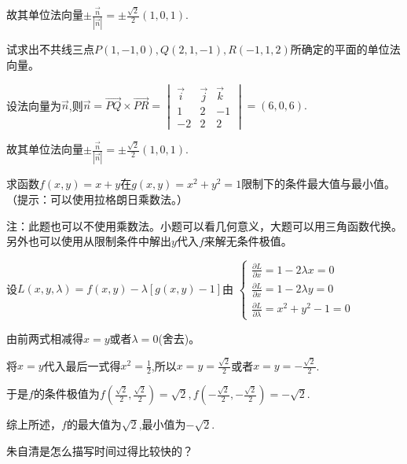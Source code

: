 \documentclass[addtable,twoside,12pt]{hnuexam}
\begin{document}
\begin{questions}
\begin{solution}
故其单位法向量$\pm\frac{\vec{n}}{|\vec{n}|}=\pm\frac{\sqrt{2}}{2}(1,0,1).$
\end{solution}

\question[9]
试求出不共线三点$P(1,-1,0),Q(2,1,-1),R(-1,1,2)$所确定的平面的单位法向量。
\begin{solution}
设法向量为$\vec{n}$,则$\vec{n}=\vec{PQ}\times\vec{PR}=
\begin{vmatrix}
	\vec{i} & \vec{j} & \vec{k} \\
	1       & 2       & -1      \\
	-2      & 2       & 2
\end{vmatrix}=(6,0,6).$
	
故其单位法向量$\pm\frac{\vec{n}}{|\vec{n}|}=\pm\frac{\sqrt{2}}{2}(1,0,1).$
\end{solution}
\clearpage

\question[10]
求函数$f(x,y)=x+y$在$g(x,y)=x^2+y^2=1$限制下的条件最大值与最小值。（提示：可以使用拉格朗日乘数法。）
\begin{solution}
注：此题也可以不使用乘数法。小题可以看几何意义，大题可以用三角函数代换。另外也可以使用从限制条件中解出$y$代入$f$来解无条件极值。

设$L(x,y,\lambda)=f(x,y)-\lambda [g(x,y)-1]$由
$\begin{cases}
	\frac{\partial L}{\partial x}=1-2\lambda x=0 \\
	\frac{\partial L}{\partial x}=1-2\lambda y=0 \\
	\frac{\partial L}{\partial \lambda}=x^2+y^2-1=0
\end{cases}$

由前两式相减得$x=y$或者$\lambda=0$(舍去)。

将$x=y$代入最后一式得$x^2=\frac{1}{2}$,所以$x=y=\frac{\sqrt{2}}{2}$或者$x=y=-\frac{\sqrt{2}}{2}$.

于是$f$的条件极值为$f(\frac{\sqrt{2}}{2},\frac{\sqrt{2}}{2})=\sqrt{2},f(-\frac{\sqrt{2}}{2},-\frac{\sqrt{2}}{2})=-\sqrt{2}.$

综上所述，$f$的最大值为$\sqrt{2}$,最小值为$-\sqrt{2}.$
\end{solution}

\question[13]
朱自清是怎么描写时间过得比较快的？
\end{questions}
\end{document}
